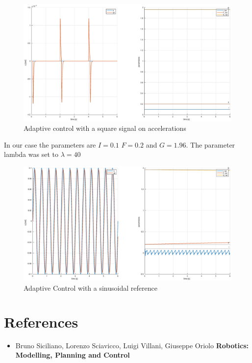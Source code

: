 \documentclass[a4paper,12pt]{article}
\begin{document}
\begin{figure}[H]
    \begin{center}
        \hspace*{-4.5cm}
        \includegraphics[scale=0.5]{images/adaptive_square.eps}
    \end{center}
    \caption{Adaptive control with a square signal on accelerations}
    \label{fig:adaptive_square}
\end{figure}

In our case the parameters are $I = 0.1$ $F = 0.2$ and $G = 1.96$. The parameter lambda was set to $\lambda = 40 $
\begin{figure}[H]
    \begin{center}
        \hspace*{-4.5cm}
        \includegraphics[scale=0.5]{images/adaptive_sin.eps}
    \end{center}
    \caption{Adaptive Control with a sinusoidal reference}
    \label{fig:adaptive_sinusoidal}
\end{figure}

\section {References}
\begin{itemize}
    \item Bruno Siciliano, Lorenzo Sciavicco, Luigi Villani, Giuseppe Oriolo \textbf{Robotics: Modelling, Planning and Control}
\end{itemize}
\end{document}
